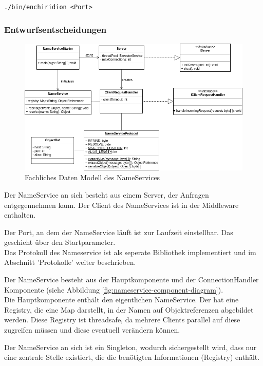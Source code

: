 \documentclass{article}
\begin{document}
\texttt{./bin/enchiridion <Port>}

\subsubsection{Entwurfsentscheidungen} \label{nameservice-entwurf}
\begin{figure}[H]
    \centering
    \includegraphics[width=\textwidth]{nameservice-fdm.png}
    \caption[fdm-nameservice]{Fachliches Daten Modell des NameServices}
    \label{fig:fdm-nameservice}
\end{figure}

Der NameService an sich besteht aus einem Server, der Anfragen entgegennehmen kann.
Der Client des NameServices ist in der Middleware enthalten.

Der Port, an dem der NameService läuft ist zur Laufzeit einstellbar. Das geschieht über den Startparameter.\\

Das Protokoll des Nameservice ist als seperate Bibliothek implementiert und im Abschnitt
'Protokolle' weiter beschrieben.

Der NameService besteht aus der Hauptkomponente und der ConnectionHandler Komponente (siehe Abbildung
\ref{fig:nameservice-component-diagram}).\\

Die Hauptkomponente enthält den eigentlichen NameService. Der hat eine Registry, die eine Map darstellt, in der Namen
auf Objektreferenzen abgebildet werden. Diese Registry ist threadsafe, da mehrere Clients parallel auf diese
zugreifen müssen und diese eventuell verändern können.

Der NameService an sich ist ein Singleton, wodurch sichergestellt wird, dass nur eine zentrale Stelle existiert, die
die benötigten Informationen (Registry) enthält.
\end{document}
